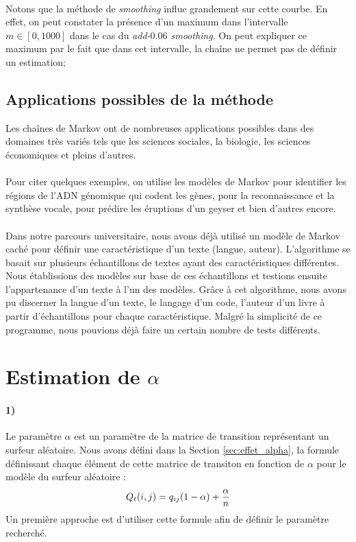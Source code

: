 \documentclass[a4paper,titlepage]{report}
\begin{document}
\paragraph{}
Notons que la méthode de \textit{smoothing} influe grandement sur cette courbe. En effet, on peut constater la présence d'un maximum dans l'intervalle $m \in [0,1000]$ dans le cas du \textit{add-$0.06$ smoothing}. On peut expliquer ce maximum par le fait que dans cet intervalle, la chaîne ne permet pas de définir un estimation;
\subsection{Applications possibles de la méthode}
Les chaînes de Markov ont de nombreuses applications possibles dans des domaines très variés tels que les sciences sociales, la biologie, les sciences économiques et pleins d'autres. \\ \\

Pour citer quelques exemples, on utilise les modèles de Markov pour identifier les régions de l'ADN génomique qui codent les gènes, pour la reconnaissance et la synthèse vocale, pour prédire les éruptions d'un geyser et bien d'autres encore. \\ \\

 Dans notre parcours universitaire, nous avons déjà utilisé un modèle de Markov caché pour définir une caractéristique d'un texte (langue, auteur). L'algorithme se basait sur plusieurs échantillons de textes ayant des caractéristiques différentes. Nous établissions des modèles sur base de ces échantillons et testions ensuite l'appartenance d'un texte à l'un des modèles. Grâce à cet algorithme, nous avons pu discerner la langue d'un texte, le langage d'un code, l'auteur d'un livre à partir d'échantillons pour chaque caractéristique. Malgré la simplicité de ce programme, nous pouvions déjà faire un certain nombre de tests différents. 

\section{Estimation de $\alpha$}
\paragraph{1)} Le paramètre $\alpha$ est un paramètre de la matrice de transition représentant un surfeur aléatoire. Nous avons défini dans la Section \ref{sec:effet_alpha}, la formule définissant chaque élément de cette matrice de transiton en fonction de $\alpha$ pour le modèle du surfeur aléatoire : 
\[
Q_t(i,j) = q_{ij} (1 - \alpha) + \dfrac{\alpha}{n}\\
\]
Un première approche est d'utiliser cette formule afin de définir le paramètre recherché. 
\end{document}

